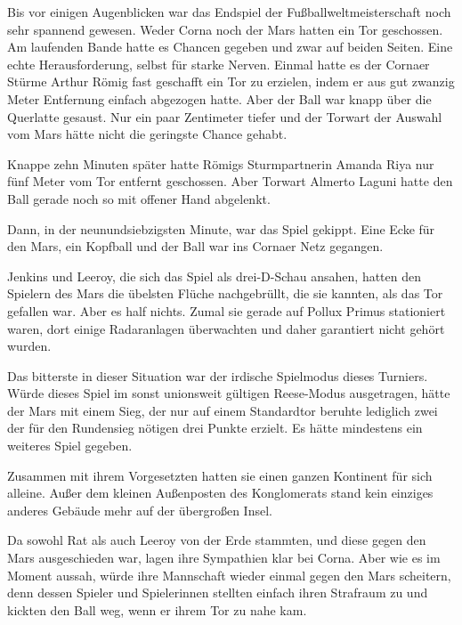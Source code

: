 Bis vor einigen Augenblicken war das Endspiel der Fußballweltmeisterschaft noch sehr spannend gewesen. Weder Corna noch der Mars hatten ein Tor geschossen. Am laufenden Bande hatte es Chancen gegeben und zwar auf beiden Seiten. Eine echte Herausforderung, selbst für starke Nerven. Einmal hatte es der Cornaer Stürme Arthur Römig fast geschafft ein Tor zu erzielen, indem er aus gut zwanzig Meter Entfernung einfach abgezogen hatte. Aber der Ball war knapp über die Querlatte gesaust. Nur ein paar Zentimeter tiefer und der Torwart der Auswahl vom Mars hätte nicht die geringste Chance gehabt.

\par

Knappe zehn Minuten später hatte Römigs Sturmpartnerin Amanda Riya nur fünf Meter vom Tor entfernt geschossen. Aber Torwart Almerto Laguni hatte den Ball gerade noch so mit offener Hand abgelenkt.

\par

Dann, in der neunundsiebzigsten Minute, war das Spiel gekippt. Eine Ecke für den Mars, ein Kopfball und der Ball war ins Cornaer Netz gegangen.

\par

Jenkins und Leeroy, die sich das Spiel als drei-D-Schau ansahen, hatten den Spielern des Mars die übelsten Flüche nachgebrüllt, die sie kannten, als das Tor gefallen war. Aber es half nichts. Zumal sie gerade auf Pollux Primus stationiert waren, dort einige Radaranlagen überwachten und daher garantiert nicht gehört wurden.

\par

Das bitterste in dieser Situation war der irdische Spielmodus dieses Turniers. Würde dieses Spiel im sonst unionsweit gültigen Reese-Modus ausgetragen, hätte der Mars mit einem Sieg, der nur auf einem Standardtor beruhte lediglich zwei der für den Rundensieg nötigen drei Punkte erzielt. Es hätte mindestens ein weiteres Spiel gegeben.

\par

Zusammen mit ihrem Vorgesetzten hatten sie einen ganzen Kontinent für sich alleine. Außer dem kleinen Außenposten des Konglomerats stand kein einziges anderes Gebäude mehr auf der übergroßen Insel.

\par

Da sowohl Rat als auch Leeroy von der Erde stammten, und diese gegen den Mars ausgeschieden war, lagen ihre Sympathien klar bei Corna. Aber wie es im Moment aussah, würde ihre Mannschaft wieder einmal gegen den Mars scheitern, denn dessen Spieler und Spielerinnen stellten einfach ihren Strafraum zu und kickten den Ball weg, wenn er ihrem Tor zu nahe kam.

